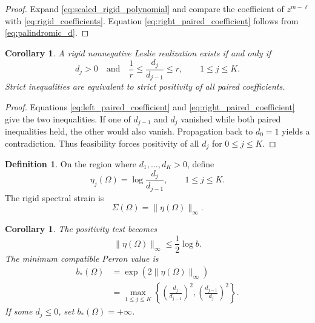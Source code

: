 \documentclass[11pt]{amsart}
\numberwithin{equation}{section}
\theoremstyle{plain}
\newtheorem{corollary}[theorem]{Corollary}
\theoremstyle{definition}
\newtheorem{definition}[theorem]{Definition}
\theoremstyle{remark}
\begin{document}
\begin{proof}
Expand \eqref{eq:scaled_rigid_polynomial} and compare the coefficient of $z^{m-\ell}$ with \eqref{eq:rigid_coefficients}.  Equation \eqref{eq:right_paired_coefficient} follows from \eqref{eq:palindromic_d}.
\end{proof}

\begin{corollary}
\label{cor:ratio_test}
A rigid nonnegative Leslie realization exists if and only if
\begin{equation}
d_j>0
\quad\text{and}\quad
\frac1r\leq\frac{d_j}{d_{j-1}}\leq r,
\qquad 1\leq j\leq K.
\label{eq:ratio_test}
\end{equation}
Strict inequalities are equivalent to strict positivity of all paired coefficients.
\end{corollary}

\begin{proof}
Equations \eqref{eq:left_paired_coefficient} and \eqref{eq:right_paired_coefficient} give the two inequalities.  If one of $d_{j-1}$ and $d_j$ vanished while both paired inequalities held, the other would also vanish.  Propagation back to $d_0=1$ yields a contradiction.  Thus feasibility forces positivity of all $d_j$ for $0\leq j\leq K$.
\end{proof}

\begin{definition}
\label{def:eta_coordinates}
On the region where $d_1,\ldots,d_K>0$, define
\begin{equation}
\eta_j(\Omega)=\log\frac{d_j}{d_{j-1}},
\qquad 1\leq j\leq K.
\label{eq:eta_definition}
\end{equation}
The rigid spectral strain is
\begin{equation}
\Sigma(\Omega)=\|\eta(\Omega)\|_\infty.
\label{eq:spectral_strain}
\end{equation}
\end{definition}

\begin{corollary}
\label{cor:box_criterion}
The positivity test becomes
\begin{equation}
\|\eta(\Omega)\|_\infty
\leq\frac12\log b.
\label{eq:eta_box}
\end{equation}
The minimum compatible Perron value is
\begin{align}
b_*(\Omega)
&=\exp\left(2\|\eta(\Omega)\|_\infty\right)
\label{eq:minimal_perron_eta}\\
&=\max_{1\leq j\leq K}
\left\{
\left(\frac{d_j}{d_{j-1}}\right)^2,
\left(\frac{d_{j-1}}{d_j}\right)^2
\right\}.
\label{eq:minimal_perron_ratios}
\end{align}
If some $d_j\leq0$, set $b_*(\Omega)=+\infty$.
\end{corollary}
\end{document}
